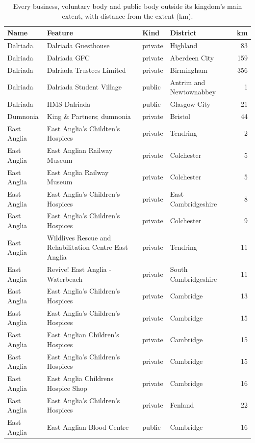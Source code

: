 \documentclass[11pt,a4paper]{article}
\begin{document}
\begin{longtable}{p{2cm}p{6.6cm}lp{3.2cm}r}\caption{Every business, voluntary body and public body outside its kingdom's main extent, with distance from the extent (km).}\label{tab:out}\\\toprule Name & Feature & Kind & District & km\\\midrule\endhead
Dalriada & Dalriada Guesthouse & private & Highland & 83\\
Dalriada & Dalriada GFC & private & Aberdeen City & 159\\
Dalriada & Dalriada Trustees Limited & private & Birmingham & 356\\
Dalriada & Dalriada Student Village & public & Antrim and Newtownabbey & 1\\
Dalriada & HMS Dalriada & public & Glasgow City & 21\\
Dumnonia & King \& Partners; dumnonia & private & Bristol & 44\\
East Anglia & East Anglia's Childten's Hospices & private & Tendring & 2\\
East Anglia & East Anglian Railway Museum & private & Colchester & 5\\
East Anglia & East Anglia Railway Museum & private & Colchester & 5\\
East Anglia & East Anglia's Children's Hospices & private & East Cambridgeshire & 8\\
East Anglia & East Anglia's Children's Hospices & private & Colchester & 9\\
East Anglia & Wildlives Rescue and Rehabilitation Centre East Anglia & private & Tendring & 11\\
East Anglia & Revive! East Anglia - Waterbeach & private & South Cambridgeshire & 11\\
East Anglia & East Anglia’s Children’s Hospices & private & Cambridge & 13\\
East Anglia & East Anglia's Children's Hospices & private & Cambridge & 15\\
East Anglia & East Anglian Children's Hospices & private & Cambridge & 15\\
East Anglia & East Anglia's Children's Hospices & private & Cambridge & 15\\
East Anglia & East Anglia Childrens Hospice Shop & private & Cambridge & 16\\
East Anglia & East Anglia's Children's Hospices & private & Fenland & 22\\
East Anglia & East Anglian Blood Centre & public & Cambridge & 16\\

\end{longtable}
\end{document}
